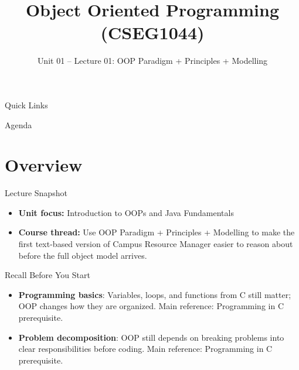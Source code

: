 \documentclass{beamer}
\title[OOPS with Java]{Object Oriented Programming (CSEG1044)}
\subtitle{Unit 01 -- Lecture 01: OOP Paradigm + Principles + Modelling}
\begin{document}
\begin{frame}[fragile]
  \titlepage
  \vspace{0.5em}
  \slidesources{\OOPSUnitISources}
\end{frame}

\begin{frame}{Quick Links}
  \centering
  \hyperlink{sec:overview}{}\hspace{0.6em}
  \hyperlink{sec:concepts}{}\hspace{0.6em}
  \hyperlink{sec:demo}{}\hspace{0.6em}
  \hyperlink{sec:summary}{}
  \slidesources{\OOPSUnitISources}
\end{frame}

\begin{frame}{Agenda}
  \tableofcontents
  \slidesources{\OOPSUnitISources}
\end{frame}

\section{Overview}
\label{sec:overview}

\begin{frame}{Lecture Snapshot}
\begin{itemize}[<+->]
  \item \textbf{Unit focus:} Introduction to OOPs and Java Fundamentals
  \item \textbf{Course thread:} Use OOP Paradigm + Principles + Modelling to make the first text-based version of Campus Resource Manager easier to reason about before the full object model arrives.
\end{itemize}
  \slidesources{\OOPSUnitISources}
\end{frame}

\begin{frame}{Recall Before You Start}
\begin{itemize}[<+->]
  \item \textbf{Programming basics}: Variables, loops, and functions from C still matter; OOP changes how they are organized. Main reference: Programming in C prerequisite.
  \item \textbf{Problem decomposition}: OOP still depends on breaking problems into clear responsibilities before coding. Main reference: Programming in C prerequisite.
\end{itemize}
  \slidesources{\OOPSUnitISources}
\end{frame}
\end{document}
